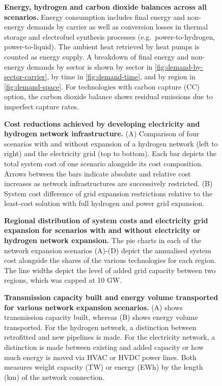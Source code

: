 
\begin{figure}[!ht]
    \caption{ \textbf{Energy, hydrogen and carbon dioxide balances across all
    scenarios.} Energy consumption includes final energy and non-energy demands
    by carrier as well as conversion losses in thermal storage and electrofuel
    synthesis processes (e.g.~power-to-hydrogen, power-to-liquid). The ambient
    heat retrieved by heat pumps is counted as energy supply. A breakdown of
    final energy and non-energy demands by sector is shown by sector in
    \cref{fig:demand-by-sector-carrier}, by time in \cref{fig:demand-time}, and
    by region in \cref{fig:demand-space}. For technologies with carbon capture
    (CC) option, the carbon dioxide balance shows residual emissions due to
    imperfect capture rates. }
    \label{fig:balance}
\end{figure}


\begin{figure}
    \caption{ \textbf{Cost reductions achieved by developing electricity and hydrogen
    network infrastructure.}
    (A) Comparison of four scenarios
    with and without expansion of a hydrogen network (left to right) and the
    electricity grid (top to bottom). Each bar depicts the total system cost of
    one scenario alongside its cost composition. Arrows between the bars
    indicate absolute and relative cost increases as network infrastructures are
    successively restricted.
    (B) System cost difference of grid expansion restrictions relative to the
    least-cost solution with full hydrogen and power grid expansion.}
    \label{fig:sensitivity-h2}
\end{figure}


\begin{figure}
    \caption{ \textbf{Regional distribution of system costs and electricity grid
    expansion for scenarios with and without electricity or hydrogen network
    expansion.} The pie charts in each of the network expansion scenarios
    (A)-(D) depict the annualised system cost alongside the shares of the
    various technologies for each region. The line widths depict the level of
    added grid capacity between two regions, which was capped at 10 GW.}
    \label{fig:tsc}
\end{figure}


\begin{figure}
    \caption{\textbf{Transmission capacity built and energy volume transported
        for various network expansion scenarios.} (A) shows transmission
        capacity built, whereas (B) shows energy volume transported. For the hydrogen
        network, a distinction between retrofitted and new pipelines is made.
        For the electricity network, a distinction is made between existing and
        added capacity or how much energy is moved via HVAC or HVDC power lines.
        Both measures weight capacity (TW) or energy (EWh) by the length (km) of
        the network connection.}
    \label{fig:network-stats}
\end{figure}

